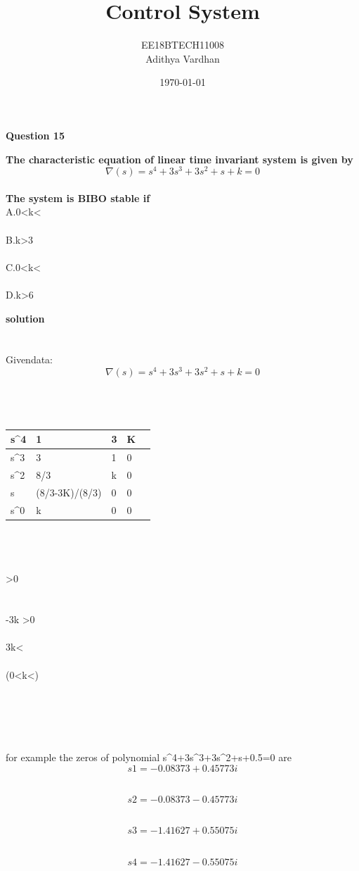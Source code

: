 \documentclass{beamer}
\begin{document}
\title[EE2227]{Control System}
\author{EE18BTECH11008\\Adithya Vardhan}
\date{\today}



\begin{frame}
  \titlepage
\end{frame}
\item \textbf{Question 15}
\item \textbf{The characteristic equation of linear time invariant system is given by $$\nabla(s)=s^4+3s^3+3s^2+s+k=0$$
\\The system is BIBO stable if}
\\A.0<k<
\\
\\B.k>3
\\
\\C.0<k<
\\
\\D.k>6
\\
\item \textbf{solution}
\\
\\
\\Givendata: $$\nabla(s)=s^4+3s^3+3s^2+s+k=0$$
\\
\\
\\
\begin{tabular}{ |p{3cm}||p{3cm}|p{3cm}|p{3cm}|p{3cm}| }

 \hline
s^4 &1&3&K\\
 \hline
 s^3 & 3&1 & 0\\
 \hline
 s^2 & 8/3 & k & 0\\
 \hline
 s & (8/3-3K)/(8/3) & 0 & 0\\
 \hline
s^0&k&0&0\\
\hline
\end{tabular}
\\
\\
\\>0
\\
\\
\\ {-3k} >0
\\
\\ 3k<
\\
\\(0<k<)
\\
\\
\\
\\
\\
\\for example the zeros of polynomial s^4+3s^3+3s^2+s+0.5=0 are 
\\$$s1=−0.08373+0.45773i$$

\\$$s2=−0.08373−0.45773i$$

\\$$s3=−1.41627+0.55075i$$

\\$$s4=−1.41627−0.55075i$$
\end{document}

